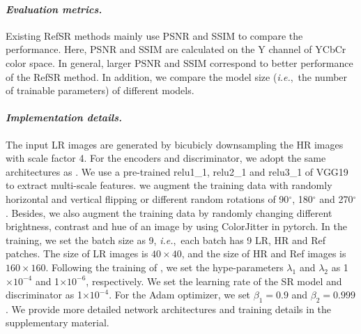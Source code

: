 \documentclass[runningheads]{llncs}
\def\ie{\mbox{\textit{i.e.}, }}
\begin{document}
\paragraph{\textbf{\emph{Evaluation metrics.}}}
Existing RefSR methods \cite{yang2020learning,jiang2021robust,yang2020learning} mainly use PSNR and SSIM to compare the performance.
Here, PSNR and SSIM are calculated on the Y channel of YCbCr color space.
In general, larger PSNR and SSIM correspond to better performance of the RefSR method.
In addition, we compare the model size (\ie the number of trainable parameters) of different models.

\paragraph{\textbf{\emph{Implementation details.}}}
The input LR images are generated by bicubicly downsampling the HR images with scale factor 4.
For the encoders and discriminator, we adopt the same architectures as \cite{jiang2021robust}.
We use a pre-trained relu1\_1, relu2\_1 and relu3\_1 of VGG19 to extract multi-scale features.
we augment the training data with randomly horizontal and vertical flipping or different random rotations of 90$^{\circ}$, 180$^{\circ}$ and 270$^{\circ}$.
Besides, we also augment the training data by randomly changing different brightness, contrast and hue of an image by using ColorJitter in pytorch.
In the training, we set the batch size as 9, \ie each batch has 9 LR, HR and Ref patches.
The size of LR images is $40{\times}40$, and the size of HR and Ref images is $160{\times}160$.
Following the training of \cite{jiang2021robust}, we set the hype-parameters $\lambda_1$ and $\lambda_2$ as 1$\times10^{-4}$ and 1$\times10^{-6}$, respectively.
We set the learning rate of the SR model and discriminator as 1$\times10^{-4}$.
For the Adam optimizer, we set $\beta_1{=}0.9$ and $\beta_2{=}0.999$.
We provide more detailed network architectures and training details in the supplementary material.
\end{document}
